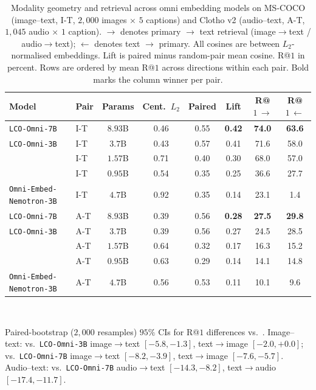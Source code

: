 \begin{table}[t]
\centering
\small
\caption{Modality geometry and retrieval across omni embedding models on MS-COCO (image--text, I-T, $2{,}000$ images $\times$ $5$ captions) and Clotho v2 (audio--text, A-T, $1{,}045$ audio $\times$ $1$ caption). $\rightarrow$ denotes primary $\rightarrow$ text retrieval (image$\rightarrow$text / audio$\rightarrow$text); $\leftarrow$ denotes text $\rightarrow$ primary. All cosines are between $L_2$-normalised embeddings. Lift is paired minus random-pair mean cosine. R@$1$ in percent. Rows are ordered by mean R@$1$ across directions within each pair. Bold marks the column winner per pair.}
\label{tab:modality-geometry}
\setlength{\tabcolsep}{3pt}
\begin{tabular}{@{}llcccccc@{}}
\toprule
Model & Pair & Params & Cent.\ $L_2$ & Paired & Lift & R@$1\,\rightarrow$ & R@$1\,\leftarrow$ \\
\midrule
\texttt{LCO-Omni-7B}                 & I-T & $8.93$B & 0.46 & 0.55 & \textbf{0.42} & \textbf{74.0} & \textbf{63.6} \\
\texttt{LCO-Omni-3B}                 & I-T & $3.7$B  & 0.43 & 0.57 & 0.41 & 71.6 & 58.0 \\
\omniSmallRetrieval{}                & I-T & $1.57$B & 0.71 & 0.40 & 0.30 & 68.0 & 57.0 \\
\omniNanoRetrieval{}                 & I-T & $0.95$B & 0.54 & 0.35 & 0.25 & 36.6 & 27.7 \\
\texttt{Omni-Embed-Nemotron-3B}      & I-T & $4.7$B  & 0.92 & 0.35 & 0.14 & 23.1 & \phantom{0}1.4 \\
\midrule
\texttt{LCO-Omni-7B}                 & A-T & $8.93$B & 0.39 & 0.56 & \textbf{0.28} & \textbf{27.5} & \textbf{29.8} \\
\texttt{LCO-Omni-3B}                 & A-T & $3.7$B  & 0.39 & 0.56 & 0.27 & 24.5 & 28.5 \\
\omniSmallRetrieval{}                & A-T & $1.57$B & 0.64 & 0.32 & 0.17 & 16.3 & 15.2 \\
\omniNanoRetrieval{}                 & A-T & $0.95$B & 0.63 & 0.29 & 0.14 & 14.1 & 14.8 \\
\texttt{Omni-Embed-Nemotron-3B}      & A-T & $4.7$B & 0.56 & 0.53 & 0.11 & 10.1 & \phantom{0}9.6 \\
\bottomrule
\end{tabular}
\\[0.4em]
\begin{minipage}{0.97\textwidth}
\footnotesize
Paired-bootstrap ($2{,}000$ resamples) $95\%$ CIs for R@$1$ differences vs.\ \omniSmallRetrieval{}.
Image--text: vs.\ \texttt{LCO-Omni-3B} image$\rightarrow$text $[-5.8, -1.3]$, text$\rightarrow$image $[-2.0, +0.0]$; vs.\ \texttt{LCO-Omni-7B} image$\rightarrow$text $[-8.2, -3.9]$, text$\rightarrow$image $[-7.6, -5.7]$.
Audio--text: vs.\ \texttt{LCO-Omni-7B} audio$\rightarrow$text $[-14.3, -8.2]$, text$\rightarrow$audio $[-17.4, -11.7]$.
\end{minipage}
\end{table}

